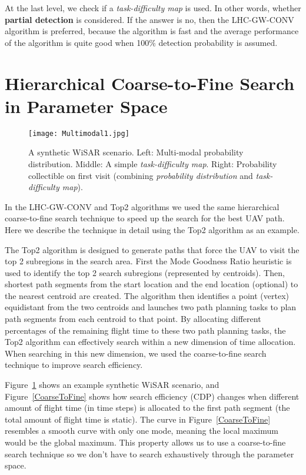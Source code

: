 At the last level, we check if a \textit{task-difficulty map} is used. In other words, whether \textbf{partial detection} is considered. If the answer is no, then the LHC-GW-CONV algorithm is preferred, because the algorithm is fast and the average performance of the algorithm is quite good when 100\% detection probability is assumed.


\section{Hierarchical Coarse-to-Fine Search in Parameter Space}
\label{CTF}

\begin{figure}
\centering
\texttt{[image: Multimodal1.jpg]}
\caption[A synthetic WiSAR scenario]{A synthetic WiSAR scenario. Left: Multi-modal probability distribution. Middle: A simple \textit{task-difficulty map}. Right: Probability collectible on first visit (combining \textit{probability distribution} and \textit{task-difficulty map}).}
\label{SyntheticCase2}
\end{figure}

In the LHC-GW-CONV and Top2 algorithms we used the same hierarchical coarse-to-fine search technique to speed up the search for the best UAV path. Here we describe the technique in detail using the Top2 algorithm as an example.

The Top2 algorithm is designed to generate paths that force the UAV to visit the top 2 subregions in the search area. First the Mode Goodness Ratio heuristic is used to identify the top 2 search subregions (represented by centroids). Then, shortest path segments from the start location and the end location (optional) to the nearest centroid are created. The algorithm then identifies a point (vertex) equidistant from the two centroids and launches two path planning tasks to plan path segments from each centroid to that point. By allocating different percentages of the remaining flight time to these two path planning tasks, the Top2 algorithm can effectively search within a new dimension of time allocation. When searching in this new dimension, we used the coarse-to-fine search technique to improve search efficiency.

Figure~\ref{SyntheticCase2} shows an example synthetic WiSAR scenario, and Figure~\ref{CoarseToFine} shows how search efficiency (CDP) changes when different amount of flight time (in time steps) is allocated to the first path segment (the total amount of flight time is static). The curve in Figure~\ref{CoarseToFine} resembles a smooth curve with only one mode, meaning the local maximum would be the global maximum. This property allows us to use a coarse-to-fine search technique so we don't have to search exhaustively through the parameter space.

